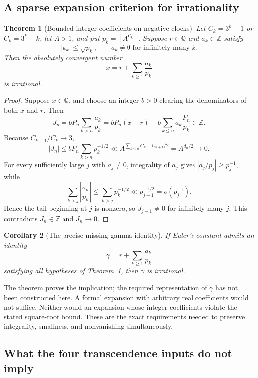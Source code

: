 \documentclass[11pt,a4paper]{article}
\numberwithin{equation}{section}
\newtheorem{theorem}{Theorem}[section]
\newtheorem{corollary}[theorem]{Corollary}
\theoremstyle{definition}
\theoremstyle{remark}
\newcommand{\Q}{\mathbb Q}
\newcommand{\Z}{\mathbb Z}
\newcommand{\floor}[1]{\left\lfloor #1\right\rfloor}
\begin{document}
\subsection{A sparse expansion criterion for irrationality}

\begin{theorem}[Bounded integer coefficients on negative clocks]
\label{rs:transfer}
Let $C_k=3^k-1$ or $C_k=3^k-k$, let $A>1$, and put
$p_k=\floor{A^{C_k}}$.  Suppose $r\in\Q$ and $a_k\in\Z$ satisfy
\[
 |a_k|\le\sqrt{p_k},\qquad
 a_k\ne0\text{ for infinitely many }k.
\]
Then the absolutely convergent number
\[
 x=r+\sum_{k\ge1}\frac{a_k}{p_k}
\]
is irrational.
\end{theorem}

\begin{proof}
Suppose $x\in\Q$, and choose an integer $b>0$ clearing the denominators
of both $x$ and $r$.  Then
\[
 J_n=bP_n\sum_{k>n}\frac{a_k}{p_k}
   =bP_n(x-r)-b\sum_{k\le n}a_k\frac{P_n}{p_k}\in\Z.
\]
Because $C_{k+1}/C_k\to3$,
\[
 |J_n|\le bP_n\sum_{k>n}p_k^{-1/2}
 \ll A^{\sum_{k\le n}C_k-C_{n+1}/2}
 =A^{d_n/2}\longrightarrow0.
\]
For every sufficiently large $j$ with $a_j\ne0$, integrality of $a_j$
gives $|a_j/p_j|\ge p_j^{-1}$, while
\[
 \sum_{k>j}\left|\frac{a_k}{p_k}\right|
 \le\sum_{k>j}p_k^{-1/2}
 \ll p_{j+1}^{-1/2}=o(p_j^{-1}).
\]
Hence the tail beginning at $j$ is nonzero, so $J_{j-1}\ne0$ for
infinitely many $j$.  This contradicts $J_n\in\Z$ and $J_n\to0$.
\end{proof}

\begin{corollary}[The precise missing gamma identity]\label{rs:gamma-link}
If Euler's constant admits an identity
\[
 \gamma=r+\sum_{k\ge1}\frac{a_k}{p_k}
\]
satisfying all hypotheses of Theorem~\ref{rs:transfer}, then $\gamma$
is irrational.
\end{corollary}

The theorem proves the implication; the required representation of
$\gamma$ has not been constructed here.  A formal expansion with arbitrary
real coefficients would not suffice.  Neither would an expansion whose
integer coefficients violate the stated square-root bound.  These are
the exact requirements needed to preserve integrality, smallness, and
nonvanishing simultaneously.

\subsection{What the four transcendence inputs do not imply}
\end{document}
